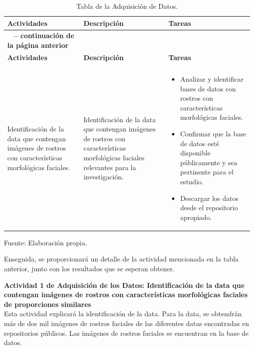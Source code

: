  \begin{longtable}{>{\raggedright\arraybackslash}p{4cm} >{\raggedright\arraybackslash}p{4cm} >{\raggedright\arraybackslash}p{5cm}}
    \caption{Tabla de la Adquisición de Datos.}
    \label{tabla:actividades}\\
    \hline
    \textbf{Actividades} & \textbf{Descripción} & \textbf{Tareas}\\
    \hline
    \endfirsthead

    \multicolumn{3}{c}%
    {{\bfseries \tablename\ \thetable{} -- continuación de la página anterior}} \\
    \hline
    \textbf{Actividades} & \textbf{Descripción} & \textbf{Tareas}\\
    \hline
    \endhead

    \hline
    \multicolumn{3}{r}{{Continúa en la siguiente página}} \\
    \endfoot

    \hline
    \endlastfoot

    Identificación de la data que contengan imágenes de rostros con características morfológicas faciales. & Identificación de la data que contengan imágenes de rostros con características morfológicas faciales relevantes para la investigación. & 
    \begin{itemize}
        \item Analizar y identificar bases de datos con rostros con características morfológicas faciales.
        \item Confirmar que la base de datos esté disponible públicamente y sea pertinente para el estudio.
        \item Descargar los datos desde el repositorio apropiado.
    \end{itemize} \\
\end{longtable}

\begin{flushleft}
    \small Fuente: Elaboración propia.
\end{flushleft}


Enseguida, se proporcionará un detalle de la actividad mencionada en la tabla anterior, junto con los resultados que se esperan obtener.
 
\textbf{Actividad 1 de Adquisición de los Datos: Identificación de la data que contengan imágenes de rostros con características morfológicas faciales de proporciones similares}
\\
Esta actividad explicará la identificación de la data. Para la data, se obtendrán más de dos mil imágenes de rostros faciales de las diferentes datas encontradas en repositorios públicos. Las imágenes de rostros faciales se encuentran en la base de datos. 
 
